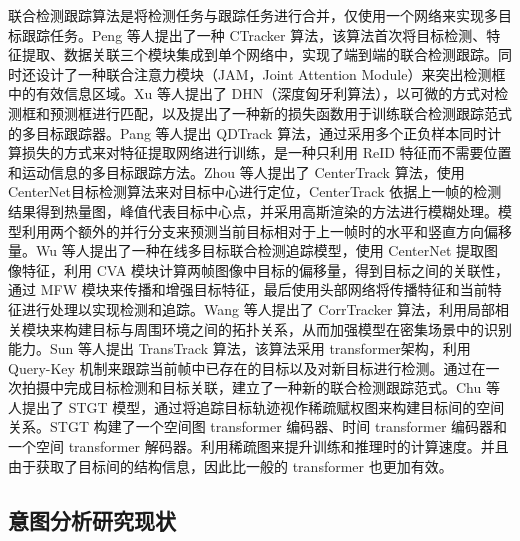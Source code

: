 联合检测跟踪算法是将检测任务与跟踪任务进行合并，仅使用一个网络来实现多目标跟踪任务。Peng 等人\cite{peng2020chained}提出了一种 CTracker 算法，该算法首次将目标检测、特征提取、数据关联三个模块集成到单个网络中，实现了端到端的联合检测跟踪。同时还设计了一种联合注意力模块（JAM，Joint Attention Module）来突出检测框中的有效信息区域。Xu 等人\cite{xu2020deep}提出了 DHN（深度匈牙利算法），以可微的方式对检测框和预测框进行匹配，以及提出了一种新的损失函数用于训练联合检测跟踪范式的多目标跟踪器。Pang 等人\cite{pang2021quasidense}提出 QDTrack 算法，通过采用多个正负样本同时计算损失的方式来对特征提取网络进行训练，是一种只利用 ReID 特征而不需要位置和运动信息的多目标跟踪方法。Zhou 等人\cite{zhou2020tracking}提出了 CenterTrack 算法，使用 CenterNet\cite{zhou2019objects}目标检测算法来对目标中心进行定位，CenterTrack 依据上一帧的检测结果得到热量图，峰值代表目标中心点，并采用高斯渲染的方法进行模糊处理。模型利用两个额外的并行分支来预测当前目标相对于上一帧时的水平和竖直方向偏移量。Wu 等人\cite{wu2021track}提出了一种在线多目标联合检测追踪模型，使用 CenterNet 提取图像特征，利用 CVA 模块计算两帧图像中目标的偏移量，得到目标之间的关联性，通过 MFW 模块来传播和增强目标特征，最后使用头部网络将传播特征和当前特征进行处理以实现检测和追踪。Wang 等人\cite{wang2021multiple}提出了 CorrTracker 算法，利用局部相关模块来构建目标与周围环境之间的拓扑关系，从而加强模型在密集场景中的识别能力。Sun 等人\cite{sun2020transtrack}提出 TransTrack 算法，该算法采用 transformer\cite{vaswani2017attention}架构，利用 Query-Key 机制来跟踪当前帧中已存在的目标以及对新目标进行检测。通过在一次拍摄中完成目标检测和目标关联，建立了一种新的联合检测跟踪范式。Chu 等人\cite{chu2023transmot}提出了 STGT 模型，通过将追踪目标轨迹视作稀疏赋权图来构建目标间的空间关系。STGT 构建了一个空间图 transformer 编码器、时间 transformer 编码器和一个空间 transformer 解码器。利用稀疏图来提升训练和推理时的计算速度。并且由于获取了目标间的结构信息，因此比一般的 transformer 也更加有效。

\subsection{意图分析研究现状}

